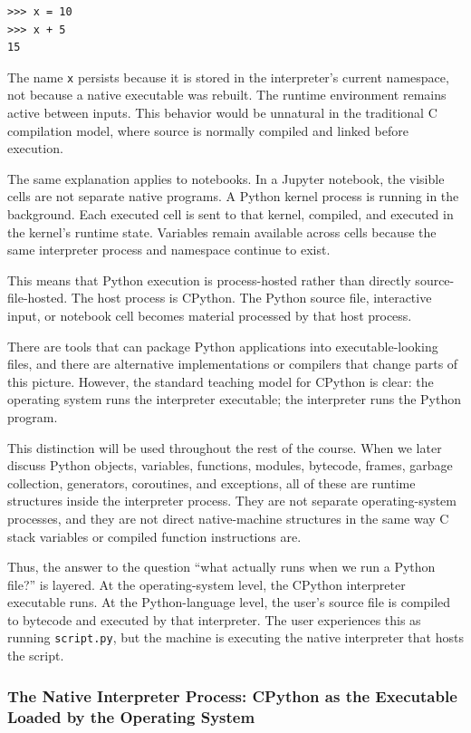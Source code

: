 \begin{verbatim}
>>> x = 10
>>> x + 5
15
\end{verbatim}

The name \texttt{x} persists because it is stored in the interpreter's current namespace, not because a native executable was rebuilt. The runtime environment remains active between inputs. This behavior would be unnatural in the traditional C compilation model, where source is normally compiled and linked before execution.

The same explanation applies to notebooks. In a Jupyter notebook, the visible cells are not separate native programs. A Python kernel process is running in the background. Each executed cell is sent to that kernel, compiled, and executed in the kernel's runtime state. Variables remain available across cells because the same interpreter process and namespace continue to exist.

This means that Python execution is process-hosted rather than directly source-file-hosted. The host process is CPython. The Python source file, interactive input, or notebook cell becomes material processed by that host process.

There are tools that can package Python applications into executable-looking files, and there are alternative implementations or compilers that change parts of this picture. However, the standard teaching model for CPython is clear: the operating system runs the interpreter executable; the interpreter runs the Python program.

This distinction will be used throughout the rest of the course. When we later discuss Python objects, variables, functions, modules, bytecode, frames, garbage collection, generators, coroutines, and exceptions, all of these are runtime structures inside the interpreter process. They are not separate operating-system processes, and they are not direct native-machine structures in the same way C stack variables or compiled function instructions are.

Thus, the answer to the question ``what actually runs when we run a Python file?'' is layered. At the operating-system level, the CPython interpreter executable runs. At the Python-language level, the user's source file is compiled to bytecode and executed by that interpreter. The user experiences this as running \texttt{script.py}, but the machine is executing the native interpreter that hosts the script.


\subsubsection{The Native Interpreter Process: CPython as the Executable Loaded by the Operating System}

